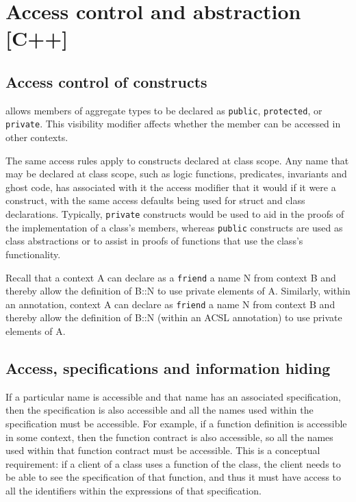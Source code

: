 \section{Access control and abstraction [C++]}
\label{sec:access}


\subsection{Access control of \NAME{} constructs}

\lang{} allows members of aggregate types to be declared as \lstinline|public|, \lstinline|protected|, or \lstinline|private|. This visibility modifier affects whether the member can be accessed in other contexts. 

The same access rules apply to \NAME{} constructs declared at class scope. Any name that may be declared at class scope, such as logic functions, predicates, invariants and ghost code, has associated with it the access modifier that it would if it were a \lang{}
construct, with the same access defaults being used for struct and class declarations. Typically, \lstinline|private| \NAME{}
constructs would be used to aid in the proofs of the implementation of a class's members, whereas 
\lstinline|public| \NAME{} constructs are used as class abstractions or to assist in proofs of functions that use the class's
functionality.

Recall that a \lang{} context A can declare as a \lstinline|friend| a name N from context B and thereby allow 
the definition of B::N to use private elements of A. Similarly, within an \NAME{} annotation, context A can declare as
\lstinline|friend| a \NAME{} name N from context B and thereby allow 
the definition of B::N (within an ACSL annotation) to use private elements of A.

 
\subsection{Access, specifications and information hiding}

If a particular \lang{} name is accessible and that name has an associated \NAME{} specification, then the specification is also accessible and all the names used within the specification must be
accessible. For example, if a function definition is accessible in some context, then the function contract is also accessible, so all the 
names used within that function contract must be accessible. This is a conceptual requirement: if a client of a class uses a function of the class, the client needs to be able to see the specification of that function, and thus it must have access to all the identifiers 
within the expressions of that specification.

